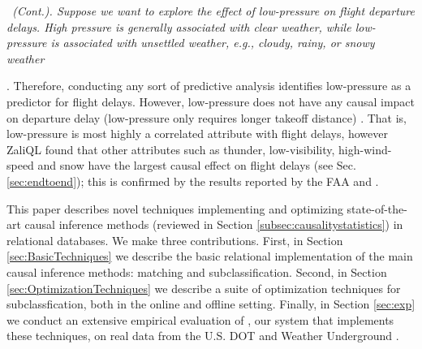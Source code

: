    \begin{example} \em \delay \ (Cont.).  \label{ex:press} \em Suppose
     we want to explore the effect of low-pressure on flight departure
     delays. High pressure is generally associated with clear weather,
     while low-pressure is associated with unsettled weather, e.g.,
     cloudy, rainy, or snowy
     weather. Therefore,
     conducting any sort of predictive analysis identifies
     low-pressure as a predictor for flight delays. However,
     low-pressure does not have any causal impact on departure delay
     (low-pressure only requires longer takeoff distance)
     \cite{FAA08}.  That is, low-pressure is most highly a correlated
     attribute with flight delays, however ZaliQL found that other
     attributes such as thunder, low-visibility, high-wind-speed and
     snow have the largest causal effect on flight delays (see
     Sec. \ref{sec:endtoend}); this is confirmed by the results
     reported by the FAA and \cite{weather}.

\end{example}







\vspace{-0.1cm}

This paper describes novel techniques implementing and optimizing
state-of-the-art causal inference methods (reviewed in Section
\ref{subsec:causalitystatistics}) in relational databases.  We make
three contributions.  First, in Section \ref{sec:BasicTechniques} we
describe the basic relational implementation of the main causal
inference methods: matching and subclassification.  Second, in Section
\ref{sec:OptimizationTechniques} we describe a suite of optimization
techniques for subclassfication, both in the online and offline
setting.  Finally, in Section \ref{sec:exp} we conduct an extensive
empirical evaluation of \GSQL, our system that implements these
techniques, on real data from the U.S. DOT and Weather Underground
\cite{flightdata,Weatherdata}.


